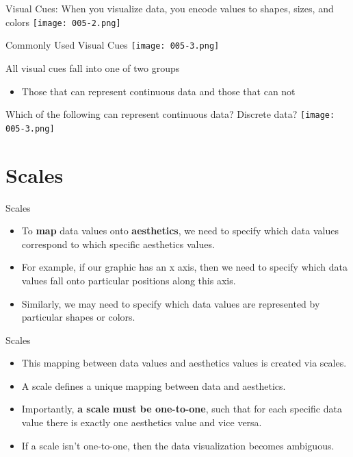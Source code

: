 \documentclass[10pt,handout]{beamer}\usepackage[]{graphicx}\usepackage[]{color}
\begin{document}
	\begin{frame}{Visual Cues: When you visualize data, you encode values to shapes, sizes, and colors}
		\centering
	\texttt{[image: 005-2.png]}
\end{frame}

	\begin{frame}{Commonly Used Visual Cues}
	\centering
	\texttt{[image: 005-3.png]}
\end{frame}

	\begin{frame}{All visual cues fall into one of two groups}
\begin{itemize}
	\item Those that can represent continuous data and those that can not
\end{itemize}
\end{frame}


	\begin{frame}{Which of the following can represent continuous data? Discrete data?}
	\centering
	\texttt{[image: 005-3.png]}
\end{frame}


\section{Scales}

\begin{frame}{Scales}
	\begin{itemize}
		\item To \textbf{map} data values onto \textbf{aesthetics}, we need to specify which data values correspond to which specific aesthetics values. \pause 
		\item For example, if our graphic has an x axis, then we need to specify which data values fall onto particular positions along this axis. \pause 
		\item Similarly, we may need to specify which data values are represented by particular shapes or colors. 
		
	\end{itemize}
\end{frame}


	\begin{frame}{Scales}
	\begin{itemize}
		\item This mapping between data values and aesthetics values is created via scales. 
		\item A scale defines a unique mapping between data and aesthetics.
		\item Importantly, \textbf{a scale must be one-to-one}, such that for each specific data value there is exactly one aesthetics value and vice versa. 
		\item If a scale isn't one-to-one, then the data visualization becomes ambiguous.		
	\end{itemize}
\end{frame}
\end{document}
